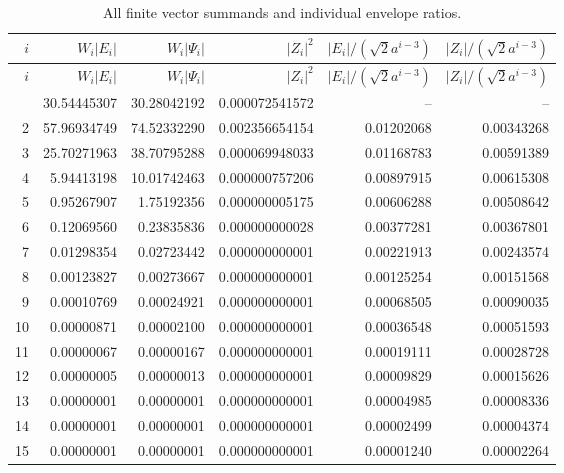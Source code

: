 {\scriptsize
\setlength{\tabcolsep}{3pt}
\begin{longtable}{rrrrrr}
\caption{All finite vector summands and individual envelope ratios.}\label{tab:vector-all}\\
\toprule $i$ & $W_i|E_i|$ & $W_i|\Psi_i|$ & $|Z_i|^2$ & $|E_i|/(\sqrt2 a^{i-3})$ & $|Z_i|/(\sqrt2 a^{i-3})$\\ \midrule
\endfirsthead
\toprule $i$ & $W_i|E_i|$ & $W_i|\Psi_i|$ & $|Z_i|^2$ & $|E_i|/(\sqrt2 a^{i-3})$ & $|Z_i|/(\sqrt2 a^{i-3})$\\ \midrule
\endhead
\bottomrule\endfoot
1 & 30.54445307 & 30.28042192 & 0.000072541572 & -- & --\\
2 & 57.96934749 & 74.52332290 & 0.002356654154 & 0.01202068 & 0.00343268\\
3 & 25.70271963 & 38.70795288 & 0.000069948033 & 0.01168783 & 0.00591389\\
4 & 5.94413198 & 10.01742463 & 0.000000757206 & 0.00897915 & 0.00615308\\
5 & 0.95267907 & 1.75192356 & 0.000000005175 & 0.00606288 & 0.00508642\\
6 & 0.12069560 & 0.23835836 & 0.000000000028 & 0.00377281 & 0.00367801\\
7 & 0.01298354 & 0.02723442 & 0.000000000001 & 0.00221913 & 0.00243574\\
8 & 0.00123827 & 0.00273667 & 0.000000000001 & 0.00125254 & 0.00151568\\
9 & 0.00010769 & 0.00024921 & 0.000000000001 & 0.00068505 & 0.00090035\\
10 & 0.00000871 & 0.00002100 & 0.000000000001 & 0.00036548 & 0.00051593\\
11 & 0.00000067 & 0.00000167 & 0.000000000001 & 0.00019111 & 0.00028728\\
12 & 0.00000005 & 0.00000013 & 0.000000000001 & 0.00009829 & 0.00015626\\
13 & 0.00000001 & 0.00000001 & 0.000000000001 & 0.00004985 & 0.00008336\\
14 & 0.00000001 & 0.00000001 & 0.000000000001 & 0.00002499 & 0.00004374\\
15 & 0.00000001 & 0.00000001 & 0.000000000001 & 0.00001240 & 0.00002264\\
\end{longtable}
}

